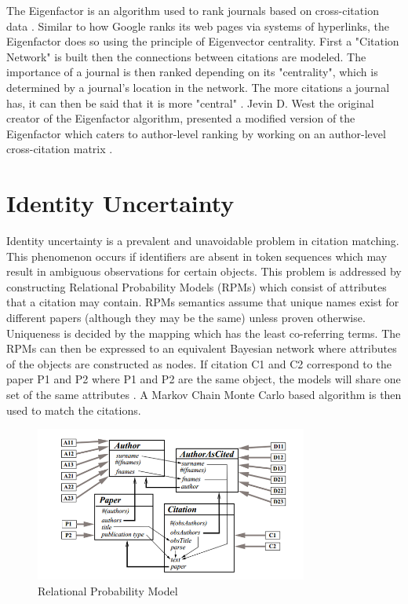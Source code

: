 The Eigenfactor is an algorithm used to rank journals based on cross-citation data \cite{eigenfactor_metrics}. Similar to how Google ranks its web pages via systems of hyperlinks, the Eigenfactor does so using the principle of Eigenvector centrality. First a "Citation Network" is built then the connections between citations are modeled. The importance of a journal is then ranked depending on its "centrality", which is determined by a journal's location in the network. The more citations a journal has, it can then be said that it is more "central" \cite{eigenfactor_rank}. Jevin D. West the original creator of the Eigenfactor algorithm, presented a modified version of the Eigenfactor which caters to author-level ranking by working on an author-level cross-citation matrix \cite{eigenfactor_influence}.

\section{Identity Uncertainty}

Identity uncertainty is a prevalent and unavoidable problem in citation matching. This phenomenon occurs if identifiers are absent in token sequences which may result in ambiguous observations for certain objects. This problem is addressed by constructing Relational Probability Models (RPMs) which consist of attributes that a citation may contain. RPMs semantics assume that unique names exist for different papers (although they may be the same) unless proven otherwise. Uniqueness is decided by the mapping which has the least co-referring terms. The RPMs can then be expressed to an equivalent Bayesian network where attributes of the objects are constructed as nodes. If citation C1 and C2 correspond to the paper P1 and P2 where P1 and P2 are the same object, the models will share one set of the same attributes \cite{identity_uncert}. A Markov Chain Monte Carlo based algorithm is then used to match the citations. \cite{markov}

\begin{figure}[H]
    \centering
    \includegraphics[width=0.8\textwidth]{RPM.png}
    \caption{Relational Probability Model}
    \label{fig:RPM}
\end{figure}

